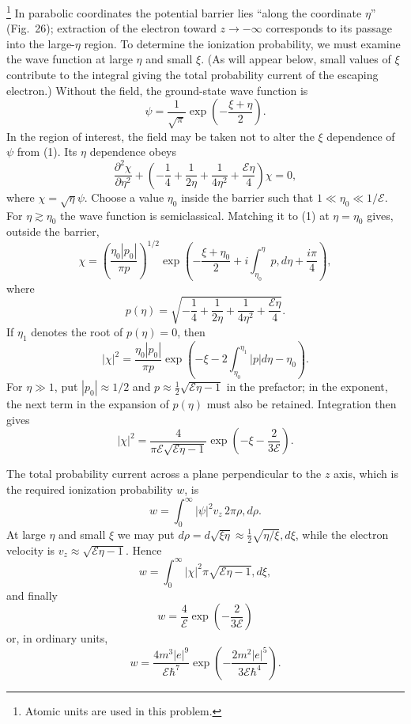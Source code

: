\SolutionHeading\footnote{Atomic units are used in this problem.} In parabolic coordinates the potential barrier lies ``along the coordinate $\eta$'' (Fig.~26); extraction of the electron toward $z\to-\infty$ corresponds to its passage into the large-$\eta$ region. To determine the ionization probability, we must examine the wave function at large $\eta$ and small $\xi$. (As will appear below, small values of $\xi$ contribute to the integral giving the total probability current of the escaping electron.) Without the field, the ground-state wave function is
\begin{equation}
 \psi=\frac1{\sqrt\pi}\exp\left(-\frac{\xi+\eta}{2}\right).
 \tag{1}
\end{equation}
In the region of interest, the field may be taken not to alter the $\xi$ dependence of $\psi$ from (1). Its $\eta$ dependence obeys
\begin{equation}
 \frac{\partial^2\chi}{\partial\eta^2}+\left(-\frac14+\frac1{2\eta}+\frac1{4\eta^2}+\frac{\mathcal E\eta}{4}\right)\chi=0,
 \tag{2}
\end{equation}
where $\chi=\sqrt\eta\psi$. Choose a value $\eta_0$ inside the barrier such that $1\ll\eta_0\ll1/\mathcal E$. For $\eta\gtrsim\eta_0$ the wave function is semiclassical. Matching it to (1) at $\eta=\eta_0$ gives, outside the barrier,
\[
 \chi=\left(\frac{\eta_0|p_0|}{\pi p}\right)^{1/2}\exp\left(-\frac{\xi+\eta_0}{2}+i\int_{\eta_0}^{\eta}p,d\eta+\frac{i\pi}{4}\right),
\]
where
\[
 p(\eta)=\sqrt{-\frac14+\frac1{2\eta}+\frac1{4\eta^2}+\frac{\mathcal E\eta}{4}}.
\]
If $\eta_1$ denotes the root of $p(\eta)=0$, then
\begin{equation}
 |\chi|^2=\frac{\eta_0|p_0|}{\pi p}\exp\left(-\xi-2\int_{\eta_0}^{\eta_1}|p|d\eta-\eta_0\right).
 \tag{3}
\end{equation}
For $\eta\gg1$, put $|p_0|\approx1/2$ and $p\approx\frac12\sqrt{\mathcal E\eta-1}$ in the prefactor; in the exponent, the next term in the expansion of $p(\eta)$ must also be retained. Integration then gives
\begin{equation}
 |\chi|^2=\frac4{\pi\mathcal E\sqrt{\mathcal E\eta-1}}\exp\left(-\xi-\frac2{3\mathcal E}\right).
 \tag{4}
\end{equation}

The total probability current across a plane perpendicular to the $z$ axis, which is the required ionization probability $w$, is
\[
 w=\int_0^\infty|\psi|^2v_z\,2\pi\rho,d\rho.
\]
At large $\eta$ and small $\xi$ we may put $d\rho=d\sqrt{\xi\eta}\approx\frac12\sqrt{\eta/\xi},d\xi$, while the electron velocity is $v_z\approx\sqrt{\mathcal E\eta-1}$. Hence
\[
 w=\int_0^\infty|\chi|^2\pi\sqrt{\mathcal E\eta-1},d\xi,
\]
and finally
\begin{equation}
 w=\frac4{\mathcal E}\exp\left(-\frac2{3\mathcal E}\right)
 \tag{5}
\end{equation}
or, in ordinary units,
\[
 w=\frac{4m^3|e|^9}{\mathcal E\hbar^7}\exp\left(-\frac{2m^2|e|^5}{3\mathcal E\hbar^4}\right).
\]

